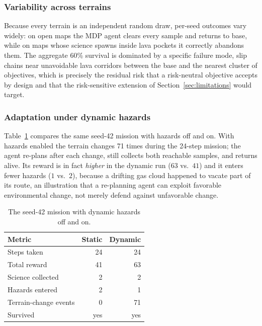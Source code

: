 \documentclass[conference]{IEEEtran}
\begin{document}
\subsubsection{Variability across terrains} Because every terrain is an independent random draw, per-seed outcomes vary widely: on open maps the MDP agent clears every sample and returns to base, while on maps whose science spawns inside lava pockets it correctly abandons them. The aggregate 60\% survival is dominated by a specific failure mode, slip chains near unavoidable lava corridors between the base and the nearest cluster of objectives, which is precisely the residual risk that a risk-neutral objective accepts by design and that the risk-sensitive extension of Section~\ref{sec:limitations} would target.

\subsubsection{Adaptation under dynamic hazards} Table~\ref{tab:dynamic} compares the same seed-42 mission with hazards off and on. With hazards enabled the terrain changes 71 times during the 24-step mission; the agent re-plans after each change, still collects both reachable samples, and returns alive. Its reward is in fact \emph{higher} in the dynamic run ($63$ vs.\ $41$) and it enters fewer hazards ($1$ vs.\ $2$), because a drifting gas cloud happened to vacate part of its route, an illustration that a re-planning agent can exploit favorable environmental change, not merely defend against unfavorable change.

\begin{table}[t]
  \caption{The seed-42 mission with dynamic hazards off and on.}
  \label{tab:dynamic}
  \centering
  \begin{tabular}{lrr}
    \toprule
    Metric & Static & Dynamic \\
    \midrule
    Steps taken            & 24  & 24 \\
    Total reward           & 41  & 63 \\
    Science collected      & 2   & 2  \\
    Hazards entered        & 2   & 1  \\
    Terrain-change events  & 0   & 71 \\
    Survived               & yes & yes \\
    \bottomrule
  \end{tabular}
\end{table}
\end{document}
